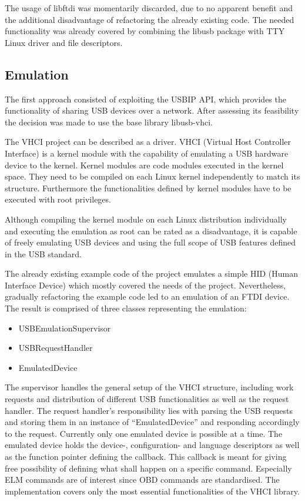 The usage of libftdi was momentarily discarded, due to no apparent benefit and the  additional disadvantage of refactoring the already existing 
code. The needed functionality was already covered by combining the libusb package with TTY Linux driver and file descriptors.

\subsection{Emulation}
\label{sec:emulation}
The first approach consisted of exploiting the USBIP API, which provides the functionality of sharing USB devices over a network. After 
assessing its feasibility the decision was made to use the base library libusb-vhci.

The VHCI project can be described as a driver. VHCI \cite{VHCI} (Virtual Host Controller Interface) is a kernel module with the capability of emulating a 
USB hardware device to the kernel. Kernel modules are code modules executed in the kernel space. They need to be compiled on each Linux kernel 
independently to match its structure. Furthermore the functionalities defined by kernel modules have to be executed with root privileges.

Although compiling the kernel module on each Linux distribution individually and executing the emulation as root can be rated as a disadvantage,
it is capable of freely emulating USB devices and using the full scope of USB features defined in the USB standard. 

The already existing example code of the project emulates a simple HID (Human Interface Device) which mostly covered the needs of the project. 
Nevertheless, gradually refactoring the example code led to an emulation of an FTDI device. The result is comprised of three classes 
representing the emulation:

\begin{itemize}
 \item USBEmulationSupervisor
 \item USBRequestHandler
 \item EmulatedDevice
\end{itemize}

The supervisor handles the general setup of the VHCI structure, including work requests and distribution of different USB functionalities as 
well as the request handler. The request handler’s responsibility lies with parsing the USB requests and storing them in an instance of 
“EmulatedDevice” and responding accordingly to the request. Currently only one emulated device is possible at a time. The emulated device holds 
the device-, configuration- and language descriptors as well as the function pointer defining the callback. This callback is meant for giving 
free possibility of defining what shall happen on a specific command. Especially ELM commands are of interest since OBD commands are 
standardised. The implementation covers only the most essential functionalities of the VHCI library.

